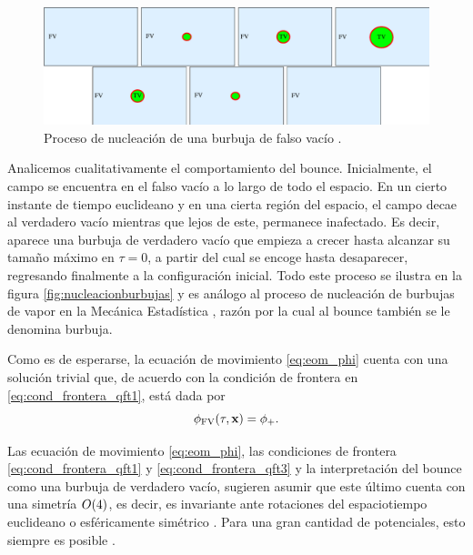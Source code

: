 \begin{figure}[t]
	\centering
	\includegraphics[scale=0.4]{FIGURAS/nucleacion_burbujas}
	\caption{Proceso de nucleación de una burbuja de falso vacío \cite{Masoumi:2015psa}.}
	\label{fig:nucleacionburbujas}
\end{figure}
Analicemos cualitativamente el comportamiento del bounce. Inicialmente, el campo se encuentra en el falso vacío a lo largo de todo el espacio.
En un cierto instante de tiempo euclideano y en una cierta región del espacio, el campo decae al verdadero vacío mientras que lejos de este, permanece inafectado. Es decir, aparece una burbuja de verdadero vacío 
que empieza a crecer hasta alcanzar su tamaño máximo en $\tau = 0$, a partir del cual se encoge hasta desaparecer, regresando finalmente a la configuración inicial. Todo este proceso se ilustra en la figura \eqref{fig:nucleacionburbujas}
y es análogo al proceso de nucleación de burbujas de vapor en la Mecánica Estadística \cite{coleman1977fate}, razón por la cual al bounce también se le denomina burbuja. 

Como es de esperarse, la ecuación de movimiento \eqref{eq:eom_phi} cuenta con una solución trivial que, de acuerdo con la condición de frontera en \eqref{eq:cond_frontera_qft1}, está dada por
\begin{equation} \label{eq:phi_trivial}
	\phi_{\text{FV}}\qty(\tau, \vb{x}) = \phi_+.
\end{equation}

Las ecuación de movimiento \eqref{eq:eom_phi}, las condiciones de frontera \eqref{eq:cond_frontera_qft1} y \eqref{eq:cond_frontera_qft3} y la interpretación del bounce como una burbuja de verdadero vacío, sugieren asumir que este último cuenta con una simetría $O\qty(4)$, es decir, es invariante ante rotaciones del espaciotiempo euclideano o esféricamente simétrico \cite{weinberg2012classical}. Para una gran cantidad de potenciales, esto siempre es posible 
\cite{coleman1978action}. 

